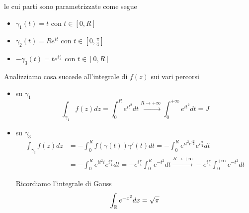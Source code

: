 le cui parti sono parametrizzate come segue
\begin{itemize}
\item $\gamma _{1}\left(t\right) = t$ con $t\in \left[ 0,R\right]$
\item $\gamma _{2}\left(t\right) = Re^{it}$ con $t\in \left[ 0,\frac{\pi }{4}\right]$
\item $ - \gamma _{3}\left(t\right) = te^{i\frac{\pi }{4}}$ con $t\in \left[ 0,R\right]$
\end{itemize}

Analizziamo cosa succede all'integrale di $f\left(z\right)$ sui vari percorsi
\begin{itemize}
\item su $\gamma _{1}$\begin{equation*}
\int\nolimits _{\gamma _{1}} f\left(z\right) dz = \int\nolimits ^{R}_{0} e^{it^{2}} dt\xrightarrow{R\rightarrow + \infty }\int\nolimits ^{ + \infty }_{0} e^{it^{2}} dt = J
\end{equation*}
\item su $\gamma _{3}$\begin{align*}
\int\nolimits _{\gamma _{3}} f\left(z\right) dz & = - \int\nolimits ^{R}_{0} f\left(\gamma \left(t\right)\right) \gamma '\left(t\right) dt = -\int\nolimits ^{R}_{0} e^{it^{2} e^{i\frac{\pi }{2}}} e^{i\frac{\pi }{4}} dt\\
 & = - \int\nolimits ^{R}_{0} e^{it^{2} i} e^{i\frac{\pi }{4}} dt = -e^{i\frac{\pi }{4}}\int\nolimits ^{R}_{0} e^{ - t^{2}} dt\xrightarrow{R\rightarrow + \infty } - e^{i\frac{\pi }{4}}\int\nolimits ^{ + \infty }_{0} e^{ - t^{2}} dt
\end{align*}

\begin{rem}
Ricordiamo l'integrale di Gauss
\begin{equation*}
\int\nolimits _{\mathbb{R} } e^{ - x^{2}} dx = \sqrt{\pi }
\end{equation*}
\end{rem}


\end{itemize}
